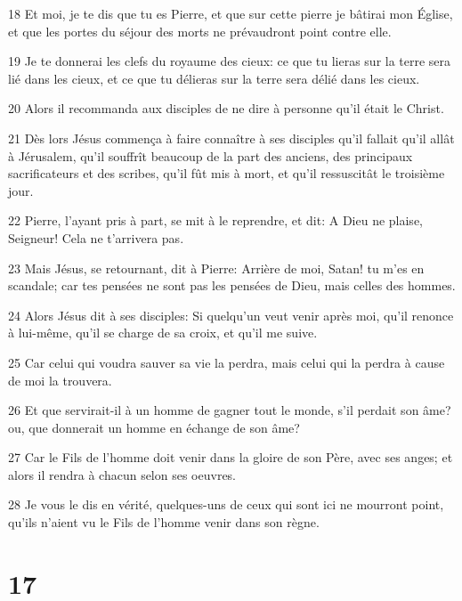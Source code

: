 \par 18 Et moi, je te dis que tu es Pierre, et que sur cette pierre je bâtirai mon Église, et que les portes du séjour des morts ne prévaudront point contre elle.
\par 19 Je te donnerai les clefs du royaume des cieux: ce que tu lieras sur la terre sera lié dans les cieux, et ce que tu délieras sur la terre sera délié dans les cieux.
\par 20 Alors il recommanda aux disciples de ne dire à personne qu'il était le Christ.
\par 21 Dès lors Jésus commença à faire connaître à ses disciples qu'il fallait qu'il allât à Jérusalem, qu'il souffrît beaucoup de la part des anciens, des principaux sacrificateurs et des scribes, qu'il fût mis à mort, et qu'il ressuscitât le troisième jour.
\par 22 Pierre, l'ayant pris à part, se mit à le reprendre, et dit: A Dieu ne plaise, Seigneur! Cela ne t'arrivera pas.
\par 23 Mais Jésus, se retournant, dit à Pierre: Arrière de moi, Satan! tu m'es en scandale; car tes pensées ne sont pas les pensées de Dieu, mais celles des hommes.
\par 24 Alors Jésus dit à ses disciples: Si quelqu'un veut venir après moi, qu'il renonce à lui-même, qu'il se charge de sa croix, et qu'il me suive.
\par 25 Car celui qui voudra sauver sa vie la perdra, mais celui qui la perdra à cause de moi la trouvera.
\par 26 Et que servirait-il à un homme de gagner tout le monde, s'il perdait son âme? ou, que donnerait un homme en échange de son âme?
\par 27 Car le Fils de l'homme doit venir dans la gloire de son Père, avec ses anges; et alors il rendra à chacun selon ses oeuvres.
\par 28 Je vous le dis en vérité, quelques-uns de ceux qui sont ici ne mourront point, qu'ils n'aient vu le Fils de l'homme venir dans son règne.

\chapter{17}

